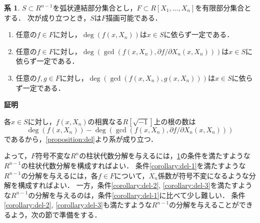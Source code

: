 \documentclass[uplatex, dvipdfmx]{jsarticle}
\makeatletter
\numberwithin{equation}{section}
\renewenvironment{proof}[1][\proofname]{\par
  \pushQED{\qed}%
  \normalfont \topsep6\p@\@plus6\p@\relax
  \trivlist
  \item\relax
  {\bfseries
  #1\@addpunct{.}}\hspace\labelsep\ignorespaces
}{
  \popQED\endtrivlist\@endpefalse
}
\theoremstyle{definition}
\newtheorem{corollary}[definition]{系}
\renewcommand{\proofname}{\textbf{証明}}
\makeatother
\begin{document}
\begin{corollary}\label{corollary:del}
     $S \subset R^{n-1}$を弧状連結部分集合とし，$F \subset R[X_1,\dots, X_n]$を有限部分集合とする．
     次が成り立つとき，$S$は$F$描画可能である．
     \begin{enumerate}
          \item \label{corollary:del-1}
          任意の$f \in F$に対し，$\deg(f(x, X_n))$は$x \in S$に依らず一定である．
          \item \label{corollary:del-2}
          任意の$f \in F$に対し，$\deg(\gcd(f(x, X_n), \partial f/ \partial X_n(x, X_n)))$は$x \in S$に依らず一定である．
          \item \label{corollary:del-3}
          任意の$f, g \in F$に対し，$\deg(\gcd(f(x, X_n), g(x, X_n)))$は$x \in S$に依らず一定である．
     \end{enumerate}
\end{corollary}

\begin{proof}
     各$x \in S$に対し，$f(x, X_n)$の相異なる$R[\sqrt{-1}]$上の根の数は
     \begin{equation}
          \deg(f(x, X_n)) - \deg(\gcd(f(x, X_n), \partial f/ \partial X_n(x, X_n)))
     \end{equation}
     であるから，\cref{proposition:del}より系が成り立つ．
\end{proof}

よって，$F$符号不変な$R^n$の柱状代数分解を与えるには，\cref{corollary:del}の条件を満たすような$R^{n-1}$の柱状代数分解を構成すればよい．
条件\ref{corollary:del-1}を満たすような$R^{n-1}$の分解を与えるには，各$f \in F$について，$X_n$係数が符号不変になるような分解を構成すればよい．
一方，条件\ref{corollary:del-2}, \ref{corollary:del-3}を満たすような$R^{n-1}$の分解を与えるのは，条件\ref{corollary:del-1}に比べて少し難しい．
条件\ref{corollary:del-2}, \ref{corollary:del-3}も満たすような$R^{n-1}$の分解を与えることができるよう，次の節で準備をする．
\end{document}
